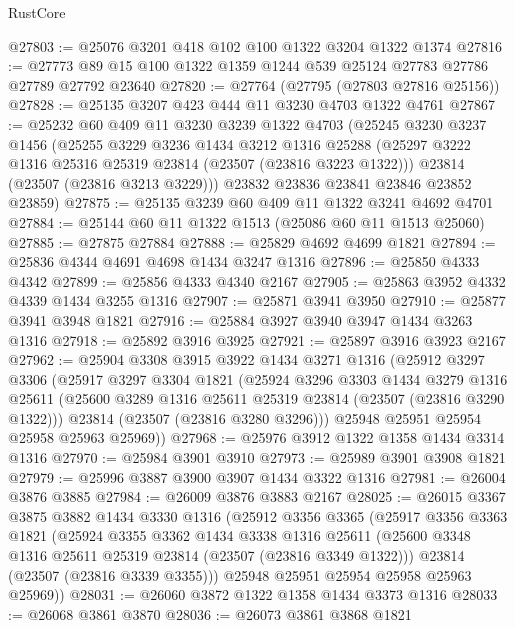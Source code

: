 \begin{lexlean}{RustCore}
\begin{coremodule}
@27803 := @25076 @3201 @418 @102 @100 @1322 @3204 @1322 @1374
@27816 := @27773 @89 @15 @100 @1322 @1359 @1244 @539 @25124 @27783 @27786 @27789 @27792 @23640
@27820 := @27764 (@27795 (@27803 @27816 @25156))
@27828 := @25135 @3207 @423 @444 @11 @3230 @4703 @1322 @4761
@27867 := @25232
    @60
    @409
    @11
    @3230
    @3239
    @1322
    @4703
    (@25245
      @3230
      @3237
      @1456
      (@25255
        @3229
        @3236
        @1434
        @3212
        @1316
        @25288
        (@25297 @3222 @1316 @25316 @25319 @23814 (@23507 (@23816 @3223 @1322)))
        @23814
        (@23507 (@23816 @3213 @3229)))
      @23832
      @23836
      @23841
      @23846
      @23852
      @23859)
@27875 := @25135 @3239 @60 @409 @11 @1322 @3241 @4692 @4701
@27884 := @25144 @60 @11 @1322 @1513 (@25086 @60 @11 @1513 @25060)
@27885 := @27875 @27884
@27888 := @25829 @4692 @4699 @1821
@27894 := @25836 @4344 @4691 @4698 @1434 @3247 @1316
@27896 := @25850 @4333 @4342
@27899 := @25856 @4333 @4340 @2167
@27905 := @25863 @3952 @4332 @4339 @1434 @3255 @1316
@27907 := @25871 @3941 @3950
@27910 := @25877 @3941 @3948 @1821
@27916 := @25884 @3927 @3940 @3947 @1434 @3263 @1316
@27918 := @25892 @3916 @3925
@27921 := @25897 @3916 @3923 @2167
@27962 := @25904
    @3308
    @3915
    @3922
    @1434
    @3271
    @1316
    (@25912
      @3297
      @3306
      (@25917
        @3297
        @3304
        @1821
        (@25924
          @3296
          @3303
          @1434
          @3279
          @1316
          @25611
          (@25600 @3289 @1316 @25611 @25319 @23814 (@23507 (@23816 @3290 @1322)))
          @23814
          (@23507 (@23816 @3280 @3296)))
        @25948
        @25951
        @25954
        @25958
        @25963
        @25969))
@27968 := @25976 @3912 @1322 @1358 @1434 @3314 @1316
@27970 := @25984 @3901 @3910
@27973 := @25989 @3901 @3908 @1821
@27979 := @25996 @3887 @3900 @3907 @1434 @3322 @1316
@27981 := @26004 @3876 @3885
@27984 := @26009 @3876 @3883 @2167
@28025 := @26015
    @3367
    @3875
    @3882
    @1434
    @3330
    @1316
    (@25912
      @3356
      @3365
      (@25917
        @3356
        @3363
        @1821
        (@25924
          @3355
          @3362
          @1434
          @3338
          @1316
          @25611
          (@25600 @3348 @1316 @25611 @25319 @23814 (@23507 (@23816 @3349 @1322)))
          @23814
          (@23507 (@23816 @3339 @3355)))
        @25948
        @25951
        @25954
        @25958
        @25963
        @25969))
@28031 := @26060 @3872 @1322 @1358 @1434 @3373 @1316
@28033 := @26068 @3861 @3870
@28036 := @26073 @3861 @3868 @1821

\end{coremodule}
\end{lexlean}
